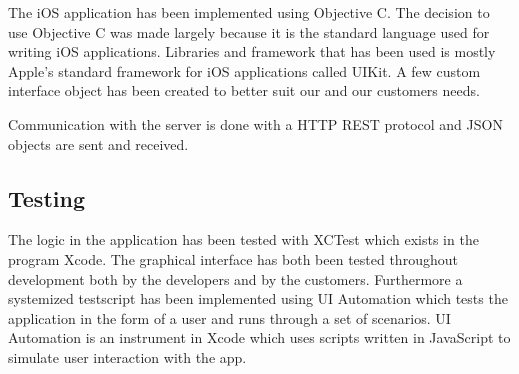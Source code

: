 The iOS application has been implemented using Objective C. The decision to use Objective C was made largely because it is the standard language used for writing iOS applications. Libraries and framework that has been used is mostly Apple's standard framework for iOS applications called UIKit. A few custom interface object has been created to better suit our and our customers needs. 

Communication with the server is done with a HTTP REST protocol and JSON objects are sent and received. 

\subsection{Testing}
The logic in the application has been tested with XCTest which exists in the program Xcode. 
The graphical interface has both been tested throughout development both by the developers and by the customers. Furthermore a systemized testscript has been implemented using UI Automation which tests the application in the form of a user and runs through a set of scenarios. UI Automation is an instrument in Xcode which uses scripts written in JavaScript to simulate user interaction with the app.
